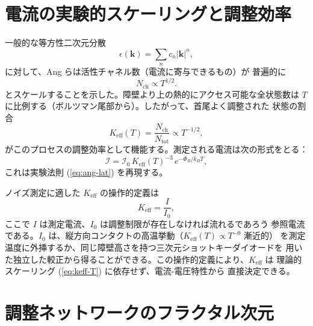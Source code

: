 \documentclass[12pt,a4paper]{article}
\newcommand{\Keff}{K_{\mathrm{eff}}}
\theoremstyle{remark}
\begin{document}
	\section{電流の実験的スケーリングと調整効率}
	
	一般的な等方性二次元分散
	\begin{equation}
		\epsilon(\mathbf{k}) = \sum_n c_n |\mathbf{k}|^n,
		\label{eq:dispersion}
	\end{equation}
	に対して、Ang らは活性チャネル数（電流に寄与できるもの）が
	普遍的に
	\begin{equation}
		N_{\mathrm{ch}} \propto T^{1/2}.
		\label{eq:Nch}
	\end{equation}
	とスケールすることを示した。障壁より上の熱的にアクセス可能な全状態数は
	$T$ に比例する（ボルツマン尾部から）。したがって、首尾よく調整された
	状態の割合
	\begin{equation}
		\Keff(T) = \frac{N_{\mathrm{ch}}}{N_{\mathrm{tot}}} \propto T^{-1/2},
		\label{eq:keff-T}
	\end{equation}
	がこのプロセスの調整効率として機能する。測定される電流は次の形式をとる：
	\begin{equation}
		\mathcal{I} = \mathcal{I}_0 \, \Keff(T)^{-3} \, e^{-\Phi_B/k_B T},
		\label{eq:I-via-keff}
	\end{equation}
	これは実験法則 (\ref{eq:ang-lat}) を再現する。
	
	ノイズ測定に適した $\Keff$ の操作的定義は
	\begin{equation}
		\Keff = \frac{I}{I_0},
		\label{eq:keff-operational}
	\end{equation}
	ここで $I$ は測定電流、$I_0$ は調整制限が存在しなければ流れるであろう
	参照電流である。$I_0$ は、縦方向コンタクトの高温挙動（$\Keff(T) \propto T^{-0}$ 漸近的）
	を測定温度に外挿するか、同じ障壁高さを持つ三次元ショットキーダイオードを
	用いた独立した較正から得ることができる。この操作的定義により、$\Keff$ は
	理論的スケーリング (\ref{eq:keff-T}) に依存せず、電流-電圧特性から
	直接決定できる。
	
	\section{調整ネットワークのフラクタル次元}
	
\end{document}

